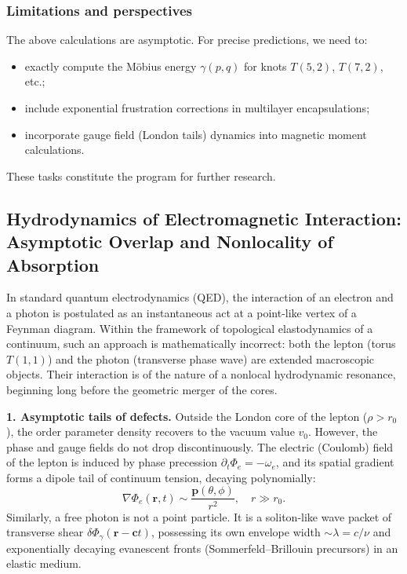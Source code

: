 \documentclass[11pt,a4paper]{article}
\begin{document}
\subsubsection{Limitations and perspectives}
The above calculations are asymptotic. For precise predictions, we need to:
\begin{itemize}
\item exactly compute the Möbius energy $\gamma(p,q)$ for knots $T(5,2)$, $T(7,2)$, etc.;
\item include exponential frustration corrections in multilayer encapsulations;
\item incorporate gauge field (London tails) dynamics into magnetic moment calculations.
\end{itemize}
These tasks constitute the program for further research.

\subsection{Hydrodynamics of Electromagnetic Interaction: Asymptotic Overlap and Nonlocality of Absorption}

In standard quantum electrodynamics (QED), the interaction of an electron and a photon is postulated as an instantaneous act at a point-like vertex of a Feynman diagram. Within the framework of topological elastodynamics of a continuum, such an approach is mathematically incorrect: both the lepton (torus $T(1,1)$) and the photon (transverse phase wave) are extended macroscopic objects. Their interaction is of the nature of a nonlocal hydrodynamic resonance, beginning long before the geometric merger of the cores.

\textbf{1. Asymptotic tails of defects.}
Outside the London core of the lepton ($\rho > r_0$), the order parameter density recovers to the vacuum value $v_0$. However, the phase and gauge fields do not drop discontinuously. The electric (Coulomb) field of the lepton is induced by phase precession $\partial_t \Phi_e = -\omega_e$, and its spatial gradient forms a dipole tail of continuum tension, decaying polynomially:
\begin{equation}
\nabla \Phi_e(\mathbf{r}, t) \sim \frac{\mathbf{p}(\theta, \phi)}{r^2}, \quad r \gg r_0.
\end{equation}
Similarly, a free photon is not a point particle. It is a soliton-like wave packet of transverse shear $\delta \Phi_\gamma(\mathbf{r}-\mathbf{c}t)$, possessing its own envelope width $\sim \lambda = c/\nu$ and exponentially decaying evanescent fronts (Sommerfeld–Brillouin precursors) in an elastic medium.
\end{document}
